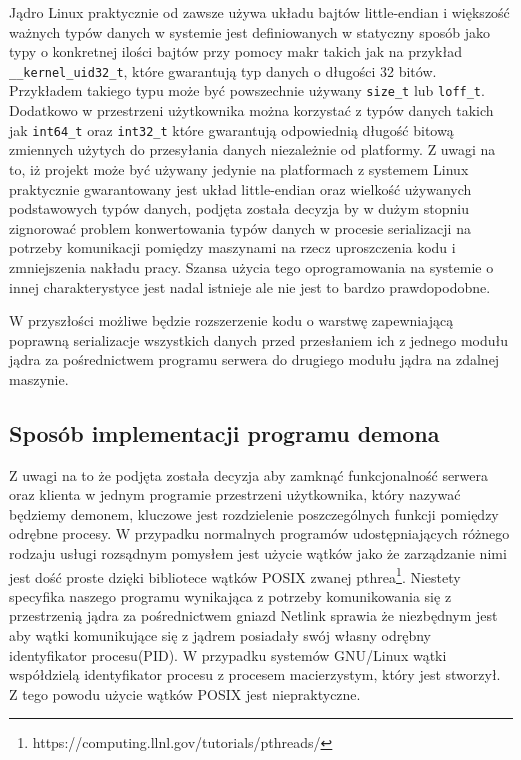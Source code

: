 \documentclass[10pt]{article}
\begin{document}
Jądro Linux praktycznie od zawsze używa układu bajtów little-endian i większość ważnych typów danych w systemie jest definiowanych w statyczny sposób jako typy o konkretnej ilości bajtów przy pomocy makr takich jak na przykład \texttt{\_\_kernel\_uid32\_t}, które gwarantują typ danych o długości 32 bitów. Przykładem takiego typu może być powszechnie używany \texttt{size\_t} lub \texttt{loff\_t}. Dodatkowo w przestrzeni użytkownika można korzystać z typów danych takich jak \texttt{int64\_t} oraz \texttt{int32\_t} które gwarantują odpowiednią długość bitową zmiennych użytych do przesyłania danych niezależnie od platformy. Z uwagi na to, iż projekt może być używany jedynie na platformach z systemem Linux praktycznie gwarantowany jest układ little-endian oraz wielkość używanych podstawowych typów danych, podjęta została decyzja by w dużym stopniu zignorować problem konwertowania typów danych w procesie serializacji na potrzeby komunikacji pomiędzy maszynami na rzecz uproszczenia kodu i zmniejszenia nakładu pracy. Szansa użycia tego oprogramowania na systemie o innej charakterystyce jest nadal istnieje ale nie jest to bardzo prawdopodobne.

W przyszłości możliwe będzie rozszerzenie kodu o warstwę zapewniającą poprawną serializacje wszystkich danych przed przesłaniem ich z jednego modułu jądra za pośrednictwem programu serwera do drugiego modułu jądra na zdalnej maszynie.

\subsection{Sposób implementacji programu demona}
\label{daemonimplementation}

Z uwagi na to że podjęta została decyzja aby zamknąć funkcjonalność serwera oraz klienta w jednym programie przestrzeni użytkownika, który nazywać będziemy demonem, kluczowe jest rozdzielenie poszczególnych funkcji pomiędzy odrębne procesy. W przypadku normalnych programów udostępniających różnego rodzaju usługi rozsądnym pomysłem jest użycie wątków jako że zarządzanie nimi jest dość proste dzięki bibliotece wątków POSIX zwanej pthrea\footnote{https://computing.llnl.gov/tutorials/pthreads/}. Niestety specyfika naszego programu wynikająca z potrzeby komunikowania się z przestrzenią jądra za pośrednictwem gniazd Netlink sprawia że niezbędnym jest aby wątki komunikujące się z jądrem posiadały swój własny odrębny identyfikator procesu(PID). W przypadku systemów GNU/Linux wątki współdzielą identyfikator procesu z procesem macierzystym, który jest stworzył. Z tego powodu użycie wątków POSIX jest niepraktyczne.
\end{document}
